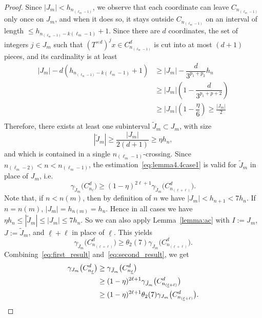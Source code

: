 \documentclass[AHL,Unicode,longabstracts]{cedram}
\newcommand{\egdef}{:=}
\newcommand{\cd}{C^{d}}
\newcommand{\td}{T^{\times d}}
\newcommand{\lb}{\underline{\ell}}
\newcommand{\Gam}[1]{\gamma_{#1}\bigl(\cd_{n_{\lb}}\bigr)}
\begin{document}
\begin{proof}
Since $|J_m|< h_ {n_{(\ell_m-1)}}$, we observe that each coordinate can leave $C_{n_{(\ell_m-1)}}$ only once on $J_m$, and when it does so, it stays outside $C_{n_{(\ell_m-1)}}$ on an interval of length $\le h_{n_{(\ell_m-1)}-k(\ell_m-1)}+1$. Since there are $d$ coordinates, the set of integers $j\in J_m$ such that $(\td)^jx\in \cd_{n_{(\ell_m-1)}}$ is cut into at most $(d+1)$ pieces, and its cardinality is at least
\begin{align*}
|J_m| - d\left(h_{n_{(\ell_m-1)}-k(\ell_m-1)}+1 \right) & \ge |J_m| - \dfrac{d}{3^{p_1+p_2}} h_{n} \\
& \ge |J_m|\left(1-\dfrac{d}{3^{p_1+p+2}}\right)\\
& \ge |J_m|\left(1-\dfrac{\eta}{6}\right) \ge \frac{|J_m|}{2}\\
\end{align*}
Therefore, there exists at least one subinterval $\tilde J_m\subset J_m$, with size
\[
|\tilde J_m| \ge \frac{|J_m|}{2(d+1)}\ge \eta h_{n},
\]
and which is contained in a single $n_{(\ell_m-1)}$-crossing. Since $n_{(\ell_m-2)}<n<n_{(\ell_m-1)}$, the estimation~\eqref{eq:lemma4.4case1} is valid for $\tilde J_m$ in place of $J_m$, i.e.
\begin{equation}\label{eq:first_result}
\gamma_{\tilde J_m}\bigl(\cd_{n_{\lb}}\bigr) \ge (1-\eta)^{2\ell+1} \gamma_{\tilde J_m} \bigl(\cd_{n_{(\lb+\ell)}}\bigr).
\end{equation}
Note that, if $n<n(m)$, then by definition of $n$ we have $|J_m|<h_{n+1}<7 h_n$. If $n=n(m)$, $|J_m|=h_{n(m)}=h_n$. Hence in all cases we have $\eta h_{n}\le |\tilde J_m| \le |J_m| \le 7 h_n$. So we can also apply Lemma~\ref{lemma:ac} with $I\egdef J_m$, $J\egdef \tilde J_m$, and $\lb+\ell$ in place of $\lb$. This yields
\begin{equation}\label{eq:second_result}
\gamma_{\tilde J_m} \bigl(\cd_{n_{(\lb+\ell)}}\bigr)\ge \theta_2(7) \gamma_{J_m} \bigl(\cd_{n_{(\lb+\ell)}}\bigr).
\end{equation}
Combining~\eqref{eq:first_result} and~\eqref{eq:second_result}, we get
\begin{align*}
\Gam{J_m} &\ge \gamma_{\tilde J_m}\bigl(\cd_{n_{\lb}}\bigr) \\
&\ge (1-\eta)^{2\ell+1} \gamma_{\tilde J_m} \bigl(\cd_{n_{(\lb+\ell)}}\bigr)\\
&\ge (1-\eta)^{2\ell+1} \theta_2(7) \gamma_{J_m} \bigl(\cd_{n_{(\lb+\ell)}}\bigr).\qedhere
\end{align*}
\end{proof}
\end{document}
